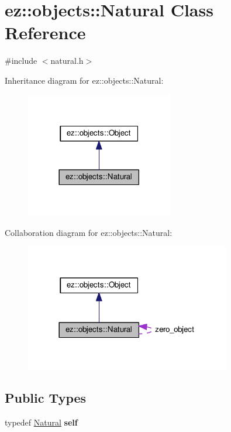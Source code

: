 \hypertarget{classez_1_1objects_1_1Natural}{}\section{ez\+:\+:objects\+:\+:Natural Class Reference}
\label{classez_1_1objects_1_1Natural}


{\ttfamily \#include $<$natural.\+h$>$}



Inheritance diagram for ez\+:\+:objects\+:\+:Natural\+:
\nopagebreak
\begin{figure}[H]
\begin{center}
\leavevmode
\includegraphics[width=182pt]{classez_1_1objects_1_1Natural__inherit__graph}
\end{center}
\end{figure}


Collaboration diagram for ez\+:\+:objects\+:\+:Natural\+:
\nopagebreak
\begin{figure}[H]
\begin{center}
\leavevmode
\includegraphics[width=254pt]{classez_1_1objects_1_1Natural__coll__graph}
\end{center}
\end{figure}
\subsection*{Public Types}
\begin{DoxyCompactItemize}
\item 
\mbox{\label{classez_1_1objects_1_1Natural_a1956903d412b416450abe5b4a3471bf7}} 
typedef \hyperlink{classez_1_1objects_1_1Natural}{Natural} {\bfseries self}
\end{DoxyCompactItemize}
